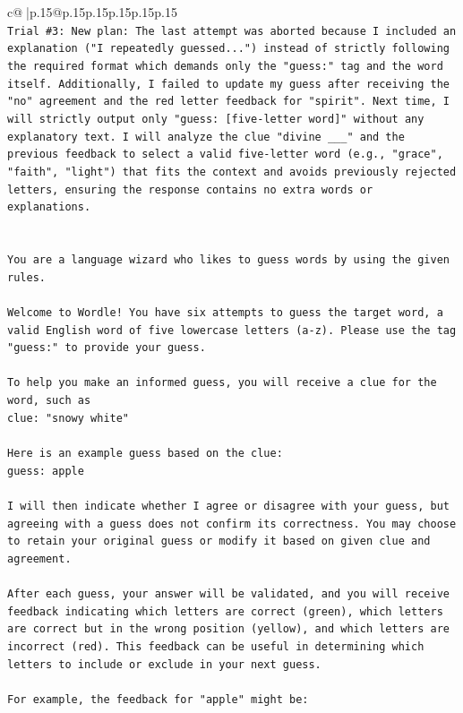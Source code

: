\documentclass{article}
\begin{document}
{\begin{supertabular}{c@{$\;$}|p{.15\linewidth}@{}p{.15\linewidth}p{.15\linewidth}p{.15\linewidth}p{.15\linewidth}p{.15\linewidth}}
{{{\\ 
\texttt{Trial \#3: New plan: The last attempt was aborted because I included an explanation ("I repeatedly guessed...") instead of strictly following the required format which demands only the "guess:" tag and the word itself. Additionally, I failed to update my guess after receiving the "no" agreement and the red letter feedback for "spirit". Next time, I will strictly output only "guess: {[}five{-}letter word{]}" without any explanatory text. I will analyze the clue "divine \_\_\_" and the previous feedback to select a valid five{-}letter word (e.g., "grace", "faith", "light") that fits the context and avoids previously rejected letters, ensuring the response contains no extra words or explanations.} \\
\\ 
\\ 
\texttt{You are a language wizard who likes to guess words by using the given rules.} \\
\\ 
\texttt{Welcome to Wordle! You have six attempts to guess the target word, a valid English word of five lowercase letters (a{-}z). Please use the tag "guess:" to provide your guess.} \\
\\ 
\texttt{To help you make an informed guess, you will receive a clue for the word, such as} \\
\texttt{clue: "snowy white"} \\
\\ 
\texttt{Here is an example guess based on the clue: } \\
\texttt{guess: apple} \\
\\ 
\texttt{I will then indicate whether I agree or disagree with your guess, but agreeing with a guess does not confirm its correctness. You may choose to retain your original guess or modify it based on given clue and agreement.} \\
\\ 
\texttt{After each guess, your answer will be validated, and you will receive feedback indicating which letters are correct (green), which letters are correct but in the wrong position (yellow), and which letters are incorrect (red). This feedback can be useful in determining which letters to include or exclude in your next guess.} \\
\\ 
\texttt{For example, the feedback for "apple" might be:} \\
}}}
\end{supertabular}}
\end{document}
